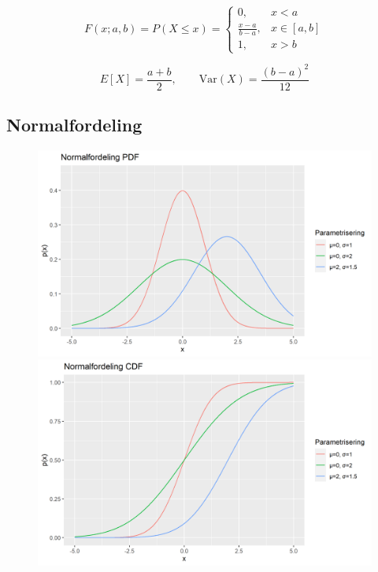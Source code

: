 \begin{equation}
    F(x; a, b) = P(X \leq x) = 
    \begin{cases}
        0, & x < a \\
        \frac{x-a}{b-a}, & x \in [a, b] \\
        1, & x > b
    \end{cases}
\end{equation}

\begin{equation}
    E[X] = \frac{a + b}{2}, \qquad \text{Var}(X) = \frac{(b-a)^2}{12}
\end{equation}

\subsection{Normalfordeling}
\begin{figure}[H]
  \centering
  \begin{minipage}[b]{0.49\textwidth}
\includegraphics[width=\textwidth]{bilete/normpdf.png}
  \end{minipage}
  \hfill
  \begin{minipage}[b]{0.49\textwidth}
    \includegraphics[width=\textwidth]{bilete/normcdf.png}
  \end{minipage}
\end{figure}

